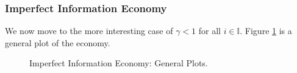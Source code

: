 \documentclass[11pt]{article}
\begin{document}
\subsubsection{Imperfect Information Economy}
We now move to the more interesting case of $\gamma < 1$ for all $i \in \mathbb{I}$. Figure \ref{figure3} is a general plot of the economy.
\begin{figure}[h!]
\centering
{}\quad
{}
 \caption{Imperfect Information Economy: General Plots.} \label{figure3}
\end{figure}\\
\end{document}
